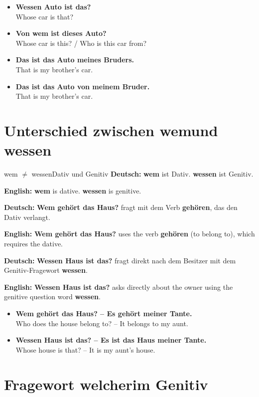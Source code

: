 \documentclass[a4paper,11pt]{article}
\newcommand{\GermanText}[1]{\textbf{Deutsch: }#1\par}
\newcommand{\EnglishText}[1]{{\small\color{SoftGray}\textbf{English: }#1\par}}
\newcommand{\ExampleItem}[2]{\item \textbf{#1}\\{\small\color{SoftGray}#2}}
\begin{document}
        \begin{exbox}
            \begin{itemize}
                \ExampleItem{Wessen Auto ist das?}{Whose car is that?}
                \ExampleItem{Von wem ist dieses Auto?}{Whose car is this? / Who is this car from?}
                \ExampleItem{Das ist das Auto meines Bruders.}{That is my brother's car.}
                \ExampleItem{Das ist das Auto von meinem Bruder.}{That is my brother's car.}
            \end{itemize}
        \end{exbox}
    
    
    \section{Unterschied zwischen \glqq wem\grqq und \glqq wessen\grqq}
        
        \begin{grammarentry}{wem $\neq$ wessen}{Dativ und Genitiv}
            \GermanText{\textbf{wem} ist Dativ. \textbf{wessen} ist Genitiv.}
            \EnglishText{\textbf{wem} is dative. \textbf{wessen} is genitive.}
            
            \GermanText{\textbf{Wem gehört das Haus?} fragt mit dem Verb \textbf{gehören}, das den Dativ verlangt.}
            \EnglishText{\textbf{Wem gehört das Haus?} uses the verb \textbf{gehören} (to belong to), which requires the dative.}
            
            \GermanText{\textbf{Wessen Haus ist das?} fragt direkt nach dem Besitzer mit dem Genitiv-Fragewort \textbf{wessen}.}
            \EnglishText{\textbf{Wessen Haus ist das?} asks directly about the owner using the genitive question word \textbf{wessen}.}
        \end{grammarentry}
        
        \begin{exbox}
            \begin{itemize}
                \ExampleItem{Wem gehört das Haus? -- Es gehört meiner Tante.}{Who does the house belong to? -- It belongs to my aunt.}
                
                \ExampleItem{Wessen Haus ist das? -- Es ist das Haus meiner Tante.}{Whose house is that? -- It is my aunt's house.}
            \end{itemize}
        \end{exbox}
    
    
    \section{Fragewort \glqq welcher\grqq im Genitiv}
        
\end{document}
